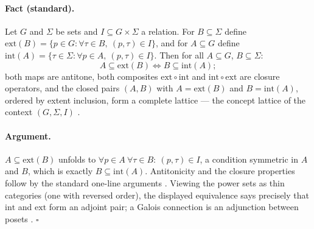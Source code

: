 \documentclass{article}
\begin{document}
\paragraph{Fact (standard).}
Let $G$ and $\Sigma$ be sets and $I \subseteq G \times \Sigma$ a relation. For $B \subseteq \Sigma$ define $\mathrm{ext}(B) = \{p \in G : \forall \tau \in B,\ (p,\tau) \in I\}$, and for $A \subseteq G$ define $\mathrm{int}(A) = \{\tau \in \Sigma : \forall p \in A,\ (p,\tau) \in I\}$. Then for all $A \subseteq G$, $B \subseteq \Sigma$:
\[
A \subseteq \mathrm{ext}(B) \iff B \subseteq \mathrm{int}(A);
\]
both maps are antitone, both composites $\mathrm{ext}\circ\mathrm{int}$ and $\mathrm{int}\circ\mathrm{ext}$ are closure operators, and the closed pairs $(A, B)$ with $A = \mathrm{ext}(B)$ and $B = \mathrm{int}(A)$, ordered by extent inclusion, form a complete lattice --- the concept lattice of the context $(G, \Sigma, I)$ \citep{ganter1999fca}.

\paragraph{Argument.}
$A \subseteq \mathrm{ext}(B)$ unfolds to $\forall p \in A\ \forall \tau \in B:\ (p,\tau) \in I$, a condition symmetric in $A$ and $B$, which is exactly $B \subseteq \mathrm{int}(A)$. Antitonicity and the closure properties follow by the standard one-line arguments \citep[Ch.~1]{ganter1999fca}. Viewing the power sets as thin categories (one with reversed order), the displayed equivalence says precisely that $\mathrm{int}$ and $\mathrm{ext}$ form an adjoint pair; a Galois connection is an adjunction between posets \citep[Ch.~IV]{maclane1998categories}. \hfill$\square$
\end{document}

